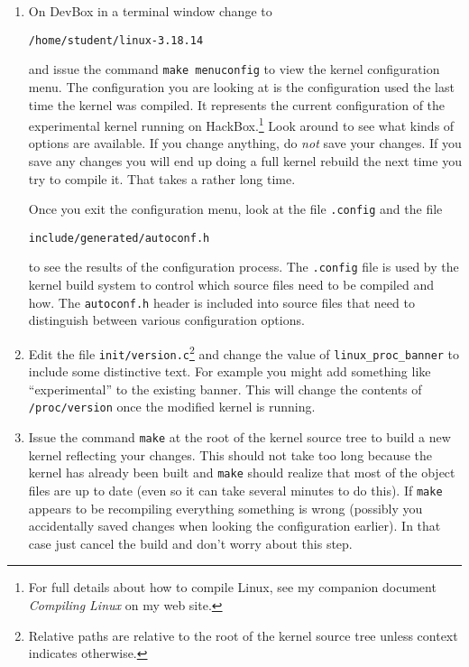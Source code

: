 \documentclass[twocolumn]{article}
\begin{document}
\begin{enumerate}
\item On DevBox in a terminal window change to
\begin{Verbatim}
/home/student/linux-3.18.14
\end{Verbatim}
  and issue the command \texttt{make menuconfig} to view the kernel configuration menu. The
  configuration you are looking at is the configuration used the last time the kernel was
  compiled. It represents the current configuration of the experimental kernel running on
  HackBox.\footnote{For full details about how to compile Linux, see my companion document
    \textit{Compiling Linux} on my web site.} Look around to see what kinds of options are
  available. If you change anything, do \emph{not} save your changes. If you save any changes
  you will end up doing a full kernel rebuild the next time you try to compile it. That takes a
  rather long time.

  Once you exit the configuration menu, look at the file \texttt{.config} and the file
\begin{Verbatim}
include/generated/autoconf.h
\end{Verbatim}
  to see the results of the configuration process. The \texttt{.config} file is used by the
  kernel build system to control which source files need to be compiled and how. The
  \texttt{autoconf.h} header is included into source files that need to distinguish between
  various configuration options.

\item Edit the file \texttt{init/version.c}\footnote{Relative paths are relative to the root of
    the kernel source tree unless context indicates otherwise.} and change the value of
  \texttt{linux\_proc\_banner} to include some distinctive text. For example you might add
  something like ``experimental'' to the existing banner. This will change the contents of
  \texttt{/proc/version} once the modified kernel is running.

\item Issue the command \texttt{make} at the root of the kernel source tree to build a new
  kernel reflecting your changes. This should not take too long because the kernel has already
  been built and \texttt{make} should realize that most of the object files are up to date (even
  so it can take several minutes to do this). If \texttt{make} appears to be recompiling
  everything something is wrong (possibly you accidentally saved changes when looking the
  configuration earlier). In that case just cancel the build and don't worry about this step.


\end{enumerate}
\end{document}
